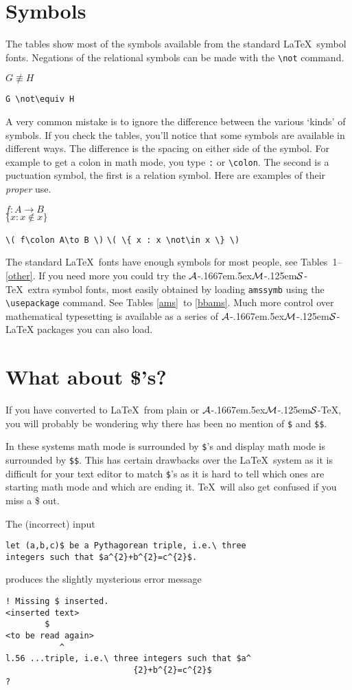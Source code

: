 \documentclass[a4paper]{article}
\newlength{\egwidth}\setlength{\egwidth}{0.45\textwidth}
\newenvironment{eg}%
{\begin{list}{}{\setlength{\leftmargin}{0pt}%
\setlength{\rightmargin}{\leftmargin}}\item[]\footnotesize}%
{\end{list}}
\newcommand{\AmsTeX}{{$\cal A$}\kern-.1667em\lower.5ex\hbox
{$\cal M$}\kern-.125em{$\cal S$}-\TeX}
\newcommand{\AmsLaTeX}{{$\cal A$}\kern-.1667em\lower.5ex\hbox
{$\cal M$}\kern-.125em{$\cal S$}-\LaTeX}
\newenvironment{egbox}%
{\begin{minipage}[t]{\egwidth}}%
{\end{minipage}}
\newcommand{\egstart}{\begin{eg}\begin{egbox}}
\newcommand{\egmid}{\end{egbox}\hfill\begin{egbox}}
\newcommand{\egend}{\end{egbox}\end{eg}}
\begin{document}
\section{Symbols}
The tables show most of the symbols available from the standard \LaTeX\ symbol 
fonts. Negations of the relational symbols can be made with the \verb|\not| 
command.

\egstart
$ G \not\equiv H $ 
\egmid
\verb|G \not\equiv H|
\egend

A very common mistake is to ignore the difference between
the various `kinds' of symbols.  If you check the tables, you'll
notice that some symbols are available in different ways.  The 
difference is the spacing on either side of the symbol.
For example to get a colon in math mode, you type \verb|:| or
\verb|\colon|.  The second is a puctuation symbol, the first is 
a relation symbol.  Here are examples of their \textit{proper} use.
\egstart
\( f\colon A\to B \)\\
\( \{ x : x \not\in x \} \)
\egmid
\verb|\( f\colon A\to B \)|
\verb|\( \{ x : x \not\in x \} \)|
\egend

The standard \LaTeX\ fonts have enough symbols for most people, see
Tables~1--\ref{other}.
If you need more you could try the \AmsTeX\ extra symbol fonts, most easily
obtained by loading \verb|amssymb| using the \verb|\usepackage| command.
See Tables \ref{ams}~to \ref{bbams}.  Much more control over mathematical
typesetting is available as a series of \AmsLaTeX{} packages you can
also load.

\section{What about \$'s?}
If you have converted to \LaTeX\ from plain or \AmsTeX, you will
probably be wondering why there has been no mention of \verb|$| 
and \verb|$$|.

In these systems math mode is surrounded by \verb|$|'s and display math mode
is surrounded by \verb|$$|. This has certain drawbacks over the \LaTeX\ system
as it is difficult for your text editor to match \verb|$|'s as it is hard to 
tell which ones are starting math mode and which are ending it. \TeX\ will also
get confused if you miss a \$ out.

The (incorrect) input 
\begin{verbatim}
let (a,b,c)$ be a Pythagorean triple, i.e.\ three 
integers such that $a^{2}+b^{2}=c^{2}$.
\end{verbatim}
produces the slightly mysterious error message
\begin{verbatim}
! Missing $ inserted.
<inserted text> 
		$
<to be read again> 
		   ^
l.56 ...triple, i.e.\ three integers such that $a^
						  {2}+b^{2}=c^{2}$
? 
\end{verbatim}
\end{document}
